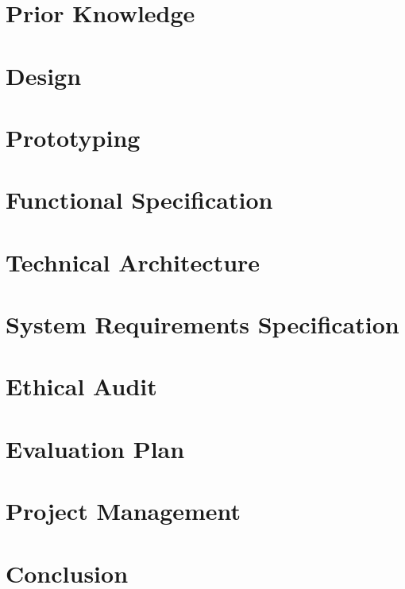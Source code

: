 \documentclass[12pt]{report}
\begin{document}
\chapter{Prior Knowledge}


\chapter{Design}


\chapter{Prototyping}


\chapter{Functional Specification}


\chapter{Technical Architecture}


\chapter{System Requirements Specification}


\chapter{Ethical Audit}


\chapter{Evaluation Plan}


\chapter{Project Management}


\chapter{Conclusion}

\end{document}
